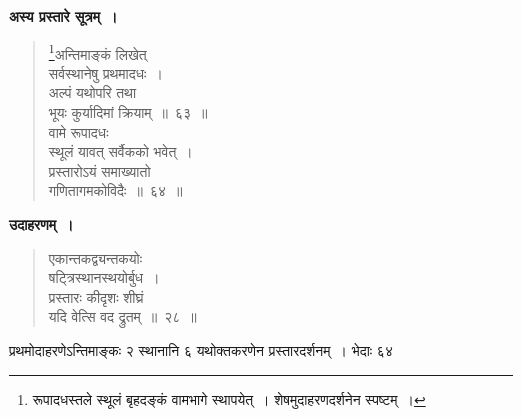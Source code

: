 \documentclass[11pt, openany]{book}
\begin{document}
\textbf{अस्य प्रस्तारे सूत्रम्~।}

\begin{quote}
\renewcommand{\thefootnote}{१}\footnote{रूपादधस्तले स्थूलं बृहदङ्कं वामभागे स्थापयेत्~। शेषमुदाहरणदर्शनेन स्पष्टम्~।}{\gk अन्तिमाङ्कं लिखेत्\\
सर्वस्थानेषु प्रथमादधः~।\\
अल्पं यथोपरि तथा\\
भूयः कुर्यादिमां क्रियाम्~॥~६३~॥\\
वामे रूपादधः\\
स्थूलं यावत् सर्वैकको भवेत्~।\\
प्रस्तारोऽयं समाख्यातो\\
गणितागमकोविदैः~॥~६४~॥}
\end{quote}

\newpage

\textbf{उदाहरणम्~।}

\begin{quote}
{\ex एकान्तकद्व्यन्तकयोः\\
षट्त्रिस्थानस्थयोर्बुध~।\\
प्रस्तारः कीदृशः शीघ्रं\\
यदि वेत्सि वद द्रुतम्~॥~२८~॥}	
\end{quote}

प्रथमोदाहरणेऽन्तिमाङ्कः २ स्थानानि ६ यथोक्तकरणेन प्रस्तारदर्शनम्~। भेदाः ६४
\end{document}

